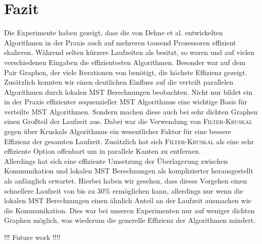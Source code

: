\section{Fazit}\label{Fazit}

Die Experimente haben gezeigt, dass die von Dehne et al. \cite{dehne1998practical} entwickelten Algorithmen in der Praxis auch auf mehreren tausend Prozessoren effizient skalieren. Während \mergeMST selten kürzere Laufzeiten als \boruvkaAllreduce besitzt, so waren \boruvkaMixedMerge und \boruvkaThenMerge auf vielen verschiedenen Eingaben die effizientesten Algorithmen. Besonder \boruvkaMixedMerge war auf dem Pair Graphen, der viele Iterationen von \boruvkaAllreduce benötigt, die höchste Effizienz gezeigt. \\
Zusätzlich konnten wir einen deutlichen Einfluss auf die verteilt parallelen Algorithmen durch lokalen MST Berechnungen beobachten. Nicht nur bildet ein in der Praxis effizienter sequenzieller MST Algorithmus eine wichtige Basis für verteilte MST Algorithmen. Sondern machen diese auch bei sehr dichten Graphen einen Großteil der Laufzeit aus. Dabei war die Verwendung von \textsc{Filter-Kruskal} gegen über Kruskals Algorithmus ein wesentlicher Faktor für eine bessere Effizienz der gesamten Laufzeit. Zusätzlich hat sich \textsc{Filter-Kruskal} als eine sehr effiziente Option offenbart um in \boruvkasAlgorithmus \space parallele Kanten zu entfernen.\\
Allerdings hat sich eine effiziente Umsetzung der Überlagerung zwischen Kommunikation und lokalen MST Berechnungen als komplizierter herausgestellt als anfänglich erwartet. Hierbei haben wir gesehen, dass dieses Vorgehen einen schnellere Laufzeit von bis zu 30\% ermöglichen kann, allerdings nur wenn die lokalen MST Berechnungen einen ähnlich Anteil an der Laufzeit ausmachen wie die Kommunikation. Dies war bei unseren Experimenten nur auf weniger dichten Graphen möglich, was wiederum die generelle Effizienz der Algorithmen mindert.


!!! Future work !!!!
